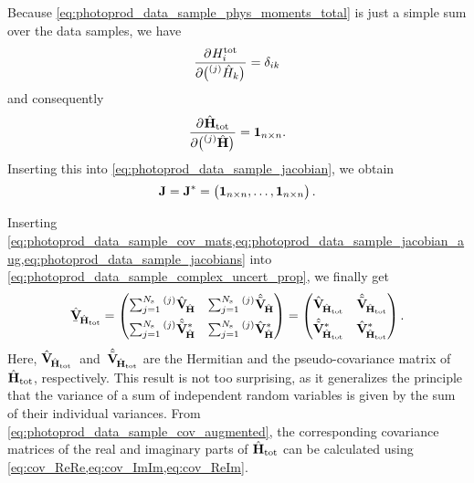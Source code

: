 Because \cref{eq:photoprod_data_sample_phys_moments_total} is just a
simple sum over the data samples, we have
\begin{equation}
  \dpd{H_i^\text{tot}}{\rBrk[1]{\prescript{(j)}{}{\vphantom{H}}\hat{H}_k}}
  = \delta_{i k}
\end{equation}
and consequently
\begin{equation}
  \dpd{\hat{\vect{H}}_\text{tot}}{\rBrk[1]{\prescript{(j)}{}{\vphantom{\vect{H}}}\hat{\vect{H}}}}
  = \mat{1}_{n \times n}.
\end{equation}
Inserting this into \cref{eq:photoprod_data_sample_jacobian}, we
obtain
\begin{equation}
  \label{eq:photoprod_data_sample_jacobians}
  \bm{\mathrm{J}}
  = \bm{\mathrm{J}}^*
  = \begin{pmatrix}
    \bm{\mathrm{1}}_{n \times n}, \ldots, \bm{\mathrm{1}}_{n \times n}
  \end{pmatrix}.
\end{equation}

Inserting
\cref{eq:photoprod_data_sample_cov_mats,eq:photoprod_data_sample_jacobian_aug,eq:photoprod_data_sample_jacobians}
into \cref{eq:photoprod_data_sample_complex_uncert_prop}, we finally
get
\begin{equation}
  \label{eq:photoprod_data_sample_cov_augmented}
  \underaccent{\bar}{\hat{\covMatSym}}_{\!\hat{\vect{H}}_\text{tot}}
  = \begin{pmatrix}
    \sum_{j = 1}^{N_\text{s}}
    \prescript{(j)}{}{\vphantom{\vect{H}}}\hat{\covMatSym}_{\!\hat{\vect{H}}} &
    \sum_{j = 1}^{N_\text{s}}
    \prescript{(j)}{}{\vphantom{\vect{H}}}\hat{\tilde{\covMatSym}}_{\!\hat{\vect{H}}} \\[1ex]
    \sum_{j = 1}^{N_\text{s}}
    \prescript{(j)}{}{\vphantom{\vect{H}}}\hat{\tilde{\covMatSym}}_{\!\hat{\vect{H}}}^* &
    \sum_{j = 1}^{N_\text{s}}
    \prescript{(j)}{}{\vphantom{\vect{H}}}\hat{\covMatSym}_{\!\hat{\vect{H}}}^*
  \end{pmatrix}
  = \begin{pmatrix}
    \hat{\covMatSym}_{\!\hat{\vect{H}}_\text{tot}} &
    \hat{\tilde{\covMatSym}}_{\!\hat{\vect{H}}_\text{tot}} \\[1ex]
    \hat{\tilde{\covMatSym}}_{\!\hat{\vect{H}}_\text{tot}}^* &
    \hat{\covMatSym}_{\!\hat{\vect{H}}_\text{tot}}^*
  \end{pmatrix}.
\end{equation}
Here,
$\hat{\bm{\mathrm{V}}}_{\!\hat{\bm{\mathrm{H}}}_\text{tot}}$~and~$\hat{\tilde{\bm{\mathrm{V}}}}_{\!\hat{\bm{\mathrm{H}}}_\text{tot}}$
are the Hermitian and the pseudo-covariance matrix
of~$\hat{\bm{\mathrm{H}}}_\text{tot}$, respectively. This result is not too
surprising, as it generalizes the principle that the variance of a sum
of independent random variables is given by the sum of their
individual variances.  From
\cref{eq:photoprod_data_sample_cov_augmented}, the corresponding
covariance matrices of the real and imaginary parts of
$\hat{\bm{\mathrm{H}}}_\text{tot}$ can be calculated using
\cref{eq:cov_ReRe,eq:cov_ImIm,eq:cov_ReIm}.
